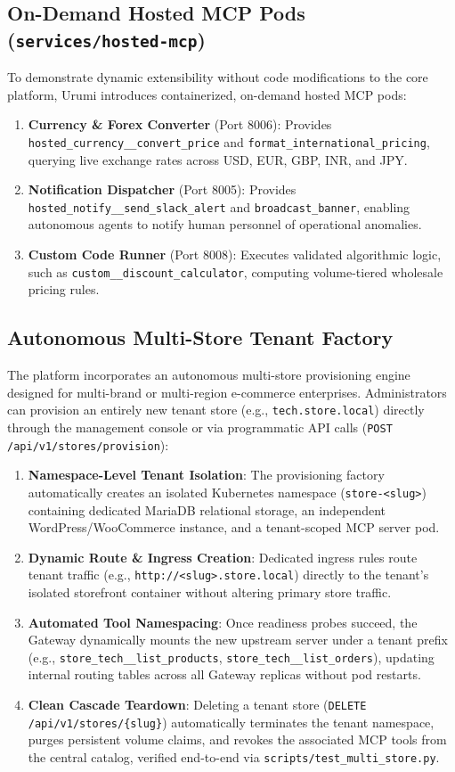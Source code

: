 \documentclass[11pt,a4paper]{article}
\begin{document}
\subsection{On-Demand Hosted MCP Pods (\texttt{services/hosted-mcp})}
To demonstrate dynamic extensibility without code modifications to the core platform, Urumi introduces containerized, on-demand hosted MCP pods:
\begin{enumerate}[leftmargin=*]
    \item \textbf{Currency \& Forex Converter} (Port 8006): Provides \texttt{hosted\_currency\_\_convert\_price} and \texttt{format\_international\_pricing}, querying live exchange rates across USD, EUR, GBP, INR, and JPY.
    \item \textbf{Notification Dispatcher} (Port 8005): Provides \texttt{hosted\_notify\_\_send\_slack\_alert} and \texttt{broadcast\_banner}, enabling autonomous agents to notify human personnel of operational anomalies.
    \item \textbf{Custom Code Runner} (Port 8008): Executes validated algorithmic logic, such as \texttt{custom\_\_discount\_calculator}, computing volume-tiered wholesale pricing rules.
\end{enumerate}

\subsection{Autonomous Multi-Store Tenant Factory}
The platform incorporates an autonomous multi-store provisioning engine designed for multi-brand or multi-region e-commerce enterprises. Administrators can provision an entirely new tenant store (e.g., \texttt{tech.store.local}) directly through the management console or via programmatic API calls (\texttt{POST /api/v1/stores/provision}):

\begin{enumerate}[leftmargin=*]
    \item \textbf{Namespace-Level Tenant Isolation}: The provisioning factory automatically creates an isolated Kubernetes namespace (\texttt{store-<slug>}) containing dedicated MariaDB relational storage, an independent WordPress/WooCommerce instance, and a tenant-scoped MCP server pod.
    \item \textbf{Dynamic Route \& Ingress Creation}: Dedicated ingress rules route tenant traffic (e.g., \texttt{http://<slug>.store.local}) directly to the tenant's isolated storefront container without altering primary store traffic.
    \item \textbf{Automated Tool Namespacing}: Once readiness probes succeed, the Gateway dynamically mounts the new upstream server under a tenant prefix (e.g., \texttt{store\_tech\_\_list\_products}, \texttt{store\_tech\_\_list\_orders}), updating internal routing tables across all Gateway replicas without pod restarts.
    \item \textbf{Clean Cascade Teardown}: Deleting a tenant store (\texttt{DELETE /api/v1/stores/\{slug\}}) automatically terminates the tenant namespace, purges persistent volume claims, and revokes the associated MCP tools from the central catalog, verified end-to-end via \texttt{scripts/test\_multi\_store.py}.
\end{enumerate}
\end{document}
